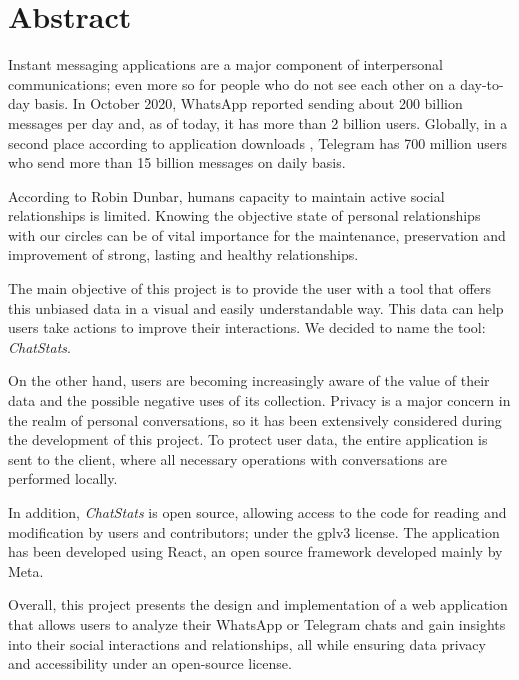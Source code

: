 \cleardoublepage
{}
\chapter*{Abstract}

Instant messaging applications are a major component of interpersonal communications; even more so for people who do not see each other on a day-to-day basis. In October 2020, WhatsApp reported sending about 200 billion messages per day \cite{whatsAppsPerDay} and, as of today, it has more than 2 billion users.\cite{whatsAppsUsers} Globally, in a second place according to application downloads \cite{telegramSecondPlaceGlobally}, Telegram has 700 million users who send more than 15 billion messages on daily basis. \cite{telegramMessagesPerDay}

According to Robin Dunbar, humans capacity to maintain active social relationships is limited.\cite{dunbarNumber} Knowing the objective state of personal relationships with our circles can be of vital importance for the maintenance, preservation and improvement of strong, lasting and healthy relationships.

The main objective of this project is to provide the user with a tool that offers this unbiased data in a visual and easily understandable way. This data can help users take actions to improve their interactions. We decided to name the tool: \textit{ChatStats}.

On the other hand, users are becoming increasingly aware of the value of their data and the possible negative uses of its collection. Privacy is a major concern in the realm of personal conversations, so it has been extensively considered during the development of this project. To protect user data, the entire application is sent to the client, where all necessary operations with conversations are performed locally.

In addition, \textit{ChatStats} is open source, allowing access to the code for reading and modification by users and contributors; under the \acrfull{gplv3} license. The application has been developed using React, an open source framework developed mainly by Meta.

Overall, this project presents the design and implementation of a web application that allows users to analyze their WhatsApp or Telegram chats and gain insights into their social interactions and relationships, all while ensuring data privacy and accessibility under an open-source license.

